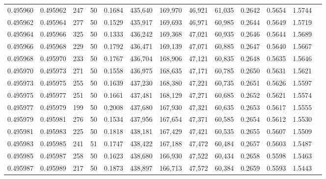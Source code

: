 \begin{tabular}{rrrrrrrrrrrrr}
0.495960 & 0.495962 &   247 &  50 &                                     0.1684 & 435,640 & 169,970 &  46,921 &  61,035 & 0.2642 & 0.5654 & 1.5744 \\
0.495962 & 0.495964 &   277 &  50 &                                     0.1529 & 435,917 & 169,693 &  46,971 &  60,985 & 0.2644 & 0.5649 & 1.5719 \\
0.495964 & 0.495966 &   325 &  50 &                                     0.1333 & 436,242 & 169,368 &  47,021 &  60,935 & 0.2646 & 0.5644 & 1.5689 \\
0.495966 & 0.495968 &   229 &  50 &                                     0.1792 & 436,471 & 169,139 &  47,071 &  60,885 & 0.2647 & 0.5640 & 1.5667 \\
0.495968 & 0.495970 &   233 &  50 &                                     0.1767 & 436,704 & 168,906 &  47,121 &  60,835 & 0.2648 & 0.5635 & 1.5646 \\
0.495970 & 0.495973 &   271 &  50 &                                     0.1558 & 436,975 & 168,635 &  47,171 &  60,785 & 0.2650 & 0.5631 & 1.5621 \\
0.495973 & 0.495975 &   255 &  50 &                                     0.1639 & 437,230 & 168,380 &  47,221 &  60,735 & 0.2651 & 0.5626 & 1.5597 \\
0.495975 & 0.495977 &   251 &  50 &                                     0.1661 & 437,481 & 168,129 &  47,271 &  60,685 & 0.2652 & 0.5621 & 1.5574 \\
0.495977 & 0.495979 &   199 &  50 &                                     0.2008 & 437,680 & 167,930 &  47,321 &  60,635 & 0.2653 & 0.5617 & 1.5555 \\
0.495979 & 0.495981 &   276 &  50 &                                     0.1534 & 437,956 & 167,654 &  47,371 &  60,585 & 0.2654 & 0.5612 & 1.5530 \\
0.495981 & 0.495983 &   225 &  50 &                                     0.1818 & 438,181 & 167,429 &  47,421 &  60,535 & 0.2655 & 0.5607 & 1.5509 \\
0.495983 & 0.495985 &   241 &  51 &                                     0.1747 & 438,422 & 167,188 &  47,472 &  60,484 & 0.2657 & 0.5603 & 1.5487 \\
0.495985 & 0.495987 &   258 &  50 &                                     0.1623 & 438,680 & 166,930 &  47,522 &  60,434 & 0.2658 & 0.5598 & 1.5463 \\
0.495987 & 0.495989 &   217 &  50 &                                     0.1873 & 438,897 & 166,713 &  47,572 &  60,384 & 0.2659 & 0.5593 & 1.5443 \\

\end{tabular}
